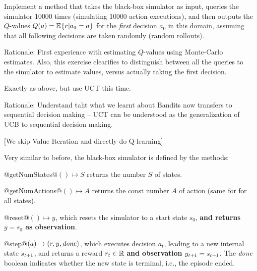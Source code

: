 Implement a method that takes the black-box simulator as input, queries the simulator 10000 times (simulating 10000 action executions), and then outputs the $Q$-values $Q(a) = \mathbb{E}_{}\!\left\{r | a_0=a\right\}$ for the
 \emph{first} decision $a_0$ in this domain, assuming that all following decisions are taken randomly (random rollouts).


Rationale: First experience with estimating $Q$-values using Monte-Carlo estimates. Also, this exercise clearifies to distinguish between all the queries to the simulator to estimate values, versus actually taking the first decision.


Exactly as above, but use UCT this time.

Rationale: Understand taht what we learnt about Bandits now transfers to sequential decision making -- UCT can be understood as the generalization of UCB to sequential decision making.



[We skip Value Iteration and directly do Q-learning]


Very similar to before, the black-box simulator is defined by the methods:
\begin{items}
\item @getNumStates@$()\mapsto S$ returns the number $S$ of states.
\item @getNumActions@$()\mapsto A$ returns the const number $A$ of action (same for for all states).
\item @reset@$() \mapsto y$, which resets the simulator to a start state $s_0$, \textbf{and returns $y=s_0$ as observation}.
\item @step@$(a) \mapsto (r,y, \emph{done})$, which executes decision $a_t$, leading to a new internal state $s_{t{{\hspace*{-.0pt}\text{\rm +}\hspace*{-.5pt}}1}}$, and returns a reward $r_t\in{\mathbb{R}}$ \textbf{and observation $y_{t{{\hspace*{-.0pt}\text{\rm +}\hspace*{-.5pt}}1}}=s_{t{{\hspace*{-.0pt}\text{\rm +}\hspace*{-.5pt}}1}}$}. The \emph{done} boolean indicates whether the new state is terminal, i.e., the episode ended.
\end{items}

